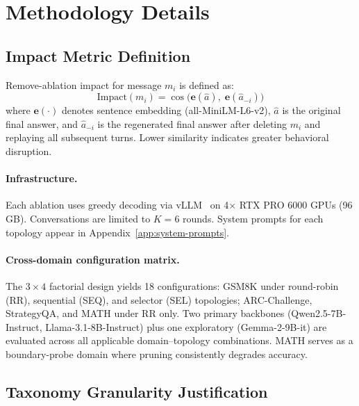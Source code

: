 \section{Methodology Details}
\label{app:methodology_details}

\subsection{Impact Metric Definition}
\label{app:impact_metric}

Remove-ablation impact for message $m_i$ is defined as:
\begin{equation}
    \text{Impact}(m_i) = \cos\bigl(\mathbf{e}(\hat{a}),\; \mathbf{e}(\hat{a}_{-i})\bigr)
\label{eq:impact}
\end{equation}
where $\mathbf{e}(\cdot)$ denotes sentence embedding (all-MiniLM-L6-v2), $\hat{a}$ is the original final answer, and $\hat{a}_{-i}$ is the regenerated final answer after deleting $m_i$ and replaying all subsequent turns. Lower similarity indicates greater behavioral disruption.

\paragraph{Infrastructure.} Each ablation uses greedy decoding via vLLM~\citep{kwon_vllm_2023} on 4$\times$ RTX PRO 6000 GPUs (96\,GB). Conversations are limited to $K = 6$ rounds. System prompts for each topology appear in Appendix~\ref{app:system-prompts}.

\paragraph{Cross-domain configuration matrix.} The $3 \times 4$ factorial design yields 18 configurations: GSM8K under round-robin (RR), sequential (SEQ), and selector (SEL) topologies; ARC-Challenge, StrategyQA, and MATH under RR only. Two primary backbones (Qwen2.5-7B-Instruct, Llama-3.1-8B-Instruct) plus one exploratory (Gemma-2-9B-it) are evaluated across all applicable domain--topology combinations. MATH serves as a boundary-probe domain where pruning consistently degrades accuracy.

\subsection{Taxonomy Granularity Justification}
\label{app:taxonomy_granularity}

